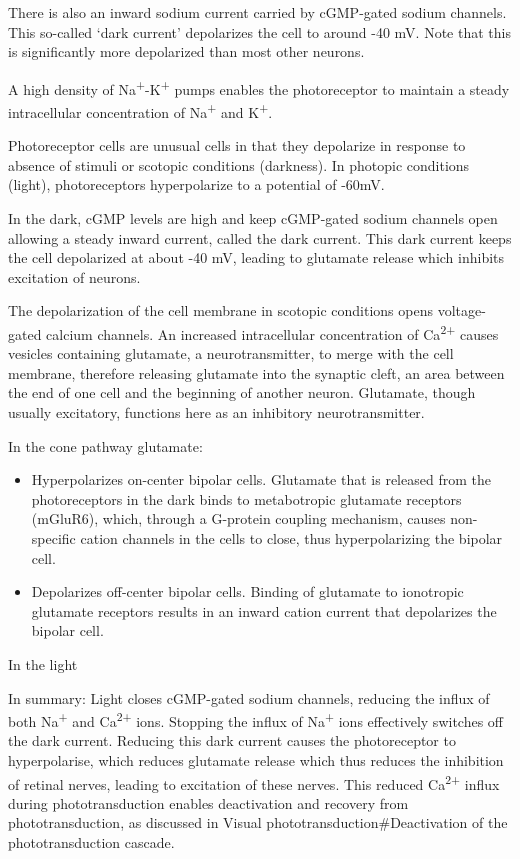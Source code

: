 There is also an inward sodium current carried by cGMP-gated sodium channels. This so-called `dark current' depolarizes the cell to around -40 mV. Note that this is significantly more depolarized than most other neurons.

A high density of Na\textsuperscript{+}-K\textsuperscript{+} pumps enables the photoreceptor to maintain a steady intracellular concentration of Na\textsuperscript{+} and K\textsuperscript{+}.

Photoreceptor cells are unusual cells in that they depolarize in response to absence of stimuli or scotopic conditions (darkness). In photopic conditions (light), photoreceptors hyperpolarize to a potential of -60mV.

In the dark, cGMP levels are high and keep cGMP-gated sodium channels open allowing a steady inward current, called the dark current. This dark current keeps the cell depolarized at about -40 mV, leading to glutamate release which inhibits excitation of neurons.

The depolarization of the cell membrane in scotopic conditions opens voltage-gated calcium channels. An increased intracellular concentration of Ca\textsuperscript{2+} causes vesicles containing glutamate, a neurotransmitter, to merge with the cell membrane, therefore releasing glutamate into the synaptic cleft, an area between the end of one cell and the beginning of another neuron. Glutamate, though usually excitatory, functions here as an inhibitory neurotransmitter.

In the cone pathway glutamate:

\begin{itemize}
\tightlist
\item
  Hyperpolarizes on-center bipolar cells. Glutamate that is released from the photoreceptors in the dark binds to metabotropic glutamate receptors (mGluR6), which, through a G-protein coupling mechanism, causes non-specific cation channels in the cells to close, thus hyperpolarizing the bipolar cell.
\item
  Depolarizes off-center bipolar cells. Binding of glutamate to ionotropic glutamate receptors results in an inward cation current that depolarizes the bipolar cell.
\end{itemize}

In the light

In summary: Light closes cGMP-gated sodium channels, reducing the influx of both Na\textsuperscript{+} and Ca\textsuperscript{2+} ions. Stopping the influx of Na\textsuperscript{+} ions effectively switches off the dark current. Reducing this dark current causes the photoreceptor to hyperpolarise, which reduces glutamate release which thus reduces the inhibition of retinal nerves, leading to excitation of these nerves. This reduced Ca\textsuperscript{2+} influx during phototransduction enables deactivation and recovery from phototransduction, as discussed in Visual phototransduction\#Deactivation of the phototransduction cascade.



